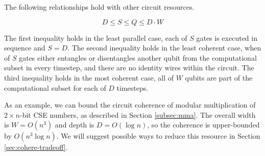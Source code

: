 The following relationships hold with other circuit resources.

\begin{equation}
D \le S \le Q \le D\cdot W
\end{equation}

The first inequality holds in the least parallel case, each of $S$ gates is executed in sequence
and $S=D$. The second inequality holds in the least coherent case, when of $S$ gates
either entangles or disentangles another qubit from the computational subset in every timestep, and
there are no identity wires within the circuit. The third inequality holds in the
most coherent case, all of $W$ qubits are part of the computational subset for each of $D$ timesteps.

As an example, we can bound the circuit coherence of modular multiplication of $2\times n$-bit
CSE numbers, as described in Section \ref{subsec:mma}. The overall width is $W = O(n^3)$ and
depth is $D=O(\log n)$, so the coherence is upper-bounded by $O(n^3\log n)$. We will suggest possible
ways to reduce this resource in Section \ref{sec:cohere-tradeoff}.